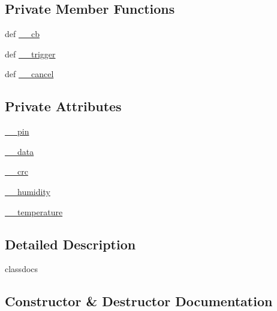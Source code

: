 \subsection*{Private Member Functions}
\begin{DoxyCompactItemize}
\item 
def \hyperlink{classconcretesensor_1_1dht22Temperature_1_1DHT22Temperature_a85d71edaa076a71d232b9bcc28f1ecf3}{\+\_\+\+\_\+cb}
\item 
def \hyperlink{classconcretesensor_1_1dht22Temperature_1_1DHT22Temperature_ad0a81370930123a9144aedb10c8050cd}{\+\_\+\+\_\+trigger}
\item 
def \hyperlink{classconcretesensor_1_1dht22Temperature_1_1DHT22Temperature_aea3834adbaae298295e01f440f467b41}{\+\_\+\+\_\+cancel}
\end{DoxyCompactItemize}
\subsection*{Private Attributes}
\begin{DoxyCompactItemize}
\item 
\hyperlink{classconcretesensor_1_1dht22Temperature_1_1DHT22Temperature_a42eff0addcaa8a81d637c16659693bab}{\+\_\+\+\_\+pin}
\item 
\hyperlink{classconcretesensor_1_1dht22Temperature_1_1DHT22Temperature_a71771647dbebd5aec2abe40e30032bdc}{\+\_\+\+\_\+data}
\item 
\hyperlink{classconcretesensor_1_1dht22Temperature_1_1DHT22Temperature_ae5f7627431c29e1360f9aad3c5e1ae55}{\+\_\+\+\_\+crc}
\item 
\hyperlink{classconcretesensor_1_1dht22Temperature_1_1DHT22Temperature_af2c2750eb140d8a7ad9e002275367afd}{\+\_\+\+\_\+humidity}
\item 
\hyperlink{classconcretesensor_1_1dht22Temperature_1_1DHT22Temperature_a7b627934acd6197755e54e0ef0b883f2}{\+\_\+\+\_\+temperature}
\end{DoxyCompactItemize}


\subsection{Detailed Description}
\begin{DoxyVerb}classdocs
\end{DoxyVerb}
 

\subsection{Constructor \& Destructor Documentation}
\hypertarget{classconcretesensor_1_1dht22Temperature_1_1DHT22Temperature_acc92361fe58e119c0918e20108aecfa0}{}
